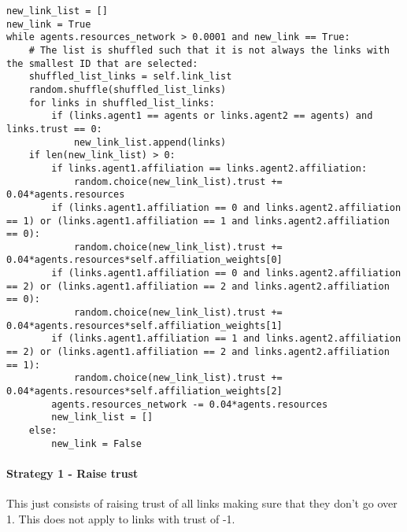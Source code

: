\begin{lstlisting}
new_link_list = []
new_link = True
while agents.resources_network > 0.0001 and new_link == True:
	# The list is shuffled such that it is not always the links with the smallest ID that are selected:
	shuffled_list_links = self.link_list
	random.shuffle(shuffled_list_links)
	for links in shuffled_list_links:
		if (links.agent1 == agents or links.agent2 == agents) and links.trust == 0:
			new_link_list.append(links)
	if len(new_link_list) > 0:
		if links.agent1.affiliation == links.agent2.affiliation:
			random.choice(new_link_list).trust += 0.04*agents.resources
		if (links.agent1.affiliation == 0 and links.agent2.affiliation == 1) or (links.agent1.affiliation == 1 and links.agent2.affiliation == 0):
			random.choice(new_link_list).trust += 0.04*agents.resources*self.affiliation_weights[0]
		if (links.agent1.affiliation == 0 and links.agent2.affiliation == 2) or (links.agent1.affiliation == 2 and links.agent2.affiliation == 0):
			random.choice(new_link_list).trust += 0.04*agents.resources*self.affiliation_weights[1]
		if (links.agent1.affiliation == 1 and links.agent2.affiliation == 2) or (links.agent1.affiliation == 2 and links.agent2.affiliation == 1):
			random.choice(new_link_list).trust += 0.04*agents.resources*self.affiliation_weights[2]
		agents.resources_network -= 0.04*agents.resources
		new_link_list = []
	else:
		new_link = False
\end{lstlisting}

\paragraph{Strategy 1 - Raise trust}

This just consists of raising trust of all links making sure that they don't go over 1. This does not apply to links with trust of -1.


